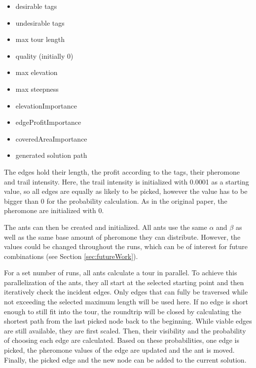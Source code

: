 \begin{minipage}[t][2cm][b]{0.3\textwidth}
	\begin{itemize}
		\item desirable tags
		\item undesirable tags
		\item max tour length
	
	\end{itemize}
\end{minipage}
\begin{minipage}[t][2cm][b]{0.3\textwidth}
	\begin{itemize}
		\item quality (initially 0)
		\item max elevation
		\item max steepness
	\end{itemize}	
\end{minipage}
\begin{minipage}[t][2.9cm][b]{0.33\textwidth}
	\begin{itemize}
		\item elevationImportance
		\item edgeProfitImportance
		\item coveredAreaImportance
		\item generated solution path
	\end{itemize}	
\end{minipage}

\vspace{1cm}
The edges hold their length, the profit according to the tags, their pheromone and trail intensity. 
Here, the trail intensity is initialized with 0.0001 as a starting value, so all edges are equally as likely to be picked, however the value has to be bigger than 0 for the probability calculation.
As in the original paper, the pheromone are initialized with 0.

The ants can then be created and initialized. 
All ants use the same $\alpha$ and $\beta$ as well as the same base amount of pheromone they can distribute.
However, the values could be changed throughout the runs, which can be of interest for future combinations (see Section \ref{sec:futureWork}).

For a set number of runs, all ants calculate a tour in parallel. 
To achieve this parallelization of the ants, they all start at the selected starting point and then iteratively check the incident edges.
Only edges that can fully be traversed while not exceeding the selected maximum length will be used here.
If no edge is short enough to still fit into the tour, the roundtrip will be closed by calculating the shortest path from the last picked node back to the beginning.
While viable edges are still available, they are first scaled.
Then, their visibility and the probability of choosing each edge are calculated.
Based on these probabilities, one edge is picked, the pheromone values of the edge are updated and the ant is moved. 
Finally, the picked edge and the new node can be added to the current solution.

